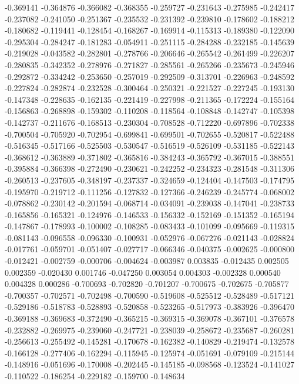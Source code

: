 -0.369141
-0.364876
-0.366082
-0.368355
-0.259727
-0.231643
-0.275985
-0.242417
-0.237082
-0.241050
-0.251367
-0.235532
-0.231392
-0.239810
-0.178602
-0.188212
-0.180682
-0.119441
-0.128454
-0.168267
-0.169914
-0.115313
-0.189380
-0.122090
-0.295304
-0.284247
-0.181283
-0.054911
-0.251115
-0.284288
-0.232185
-0.145639
-0.219028
-0.043582
-0.282801
-0.278766
-0.206646
-0.265542
-0.261499
-0.226207
-0.280835
-0.342352
-0.278976
-0.271827
-0.285561
-0.265266
-0.235673
-0.245946
-0.292872
-0.334242
-0.253650
-0.257019
-0.292509
-0.313701
-0.226963
-0.248592
-0.227824
-0.282874
-0.232528
-0.300464
-0.250321
-0.221527
-0.227245
-0.193130
-0.147348
-0.228635
-0.162135
-0.221419
-0.227998
-0.211365
-0.172224
-0.155164
-0.156863
-0.268898
-0.159302
-0.110208
-0.118564
-0.108848
-0.142747
-0.105398
-0.142737
-0.211676
-0.168513
-0.230304
-0.708528
-0.712220
-0.697896
-0.702338
-0.700504
-0.705920
-0.702954
-0.699841
-0.699501
-0.702655
-0.520817
-0.522488
-0.516345
-0.517166
-0.525503
-0.530547
-0.516519
-0.526109
-0.531185
-0.522143
-0.368612
-0.363889
-0.371802
-0.365816
-0.384243
-0.365792
-0.367015
-0.388551
-0.395884
-0.366398
-0.272490
-0.230621
-0.242252
-0.234323
-0.281548
-0.311306
-0.260513
-0.237605
-0.348197
-0.237337
-0.324659
-0.124404
-0.147503
-0.174795
-0.195970
-0.219712
-0.111256
-0.127832
-0.127366
-0.246239
-0.245774
-0.068002
-0.078862
-0.230142
-0.201594
-0.068714
-0.034091
-0.239038
-0.147041
-0.238733
-0.165856
-0.165321
-0.124976
-0.146533
-0.156332
-0.152169
-0.151352
-0.165194
-0.147867
-0.178993
-0.100002
-0.108285
-0.083433
-0.101099
-0.095669
-0.119315
-0.081143
-0.096558
-0.096330
-0.100931
-0.052976
-0.067276
-0.021143
-0.028824
-0.017761
-0.059701
-0.051407
-0.027717
-0.066346
-0.040375
-0.002625
-0.000800
-0.012421
-0.002759
-0.000706
-0.004624
-0.003987
0.003835
-0.012435
0.002505
0.002359
-0.020430
0.001746
-0.047250
0.003054
0.004303
-0.002328
0.000540
0.004328
0.000286
-0.700693
-0.702820
-0.701207
-0.700675
-0.702675
-0.705877
-0.700357
-0.702571
-0.702498
-0.700590
-0.519608
-0.525512
-0.528489
-0.517121
-0.529186
-0.518783
-0.528893
-0.520858
-0.523265
-0.517973
-0.383926
-0.396470
-0.369188
-0.369683
-0.372490
-0.365215
-0.369315
-0.369078
-0.367101
-0.376578
-0.232882
-0.269975
-0.239060
-0.247721
-0.238039
-0.258672
-0.235687
-0.260281
-0.256613
-0.255492
-0.145281
-0.170678
-0.162382
-0.140829
-0.219474
-0.132578
-0.166128
-0.277406
-0.162294
-0.115945
-0.125974
-0.051691
-0.079109
-0.215144
-0.148916
-0.051696
-0.170008
-0.202445
-0.145185
-0.098568
-0.123524
-0.141027
-0.110522
-0.186254
-0.229182
-0.159700
-0.148634
